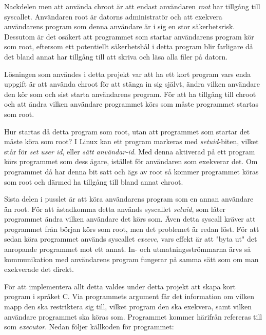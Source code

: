 \documentclass{article}
\begin{document}
Nackdelen men att använda chroot är att endast användaren \textit{root} har
tillgång till syscallet. Användaren root är datorns administratör och att
exekvera an\-vändarens program som denna användare är i sig en stor säkerhetsrisk.
Dessutom är det osäkert att programmet som startar användarens program kör som
root, eftersom ett potentiellt säkerhetshål i detta program blir farligare då
det bland annat har tillgång till att skriva och läsa alla filer på datorn.

Lösningen som användes i detta projekt var att ha ett kort program vars enda
uppgift är att använda chroot för att stänga in sig självt, ändra vilken
användare den kör som och sist starta användarens program. För att ha tillgång
till chroot och att ändra vilken användare programmet körs som måste programmet
startas som root.

Hur startas då detta program som root, utan att programmet som startar det måste
köra som root? I Linux kan ett program markeras med \textit{setuid}-biten,
vilket står för \textit{set user id}, eller \textit{sätt användar-id}. Med
denna aktiverad på ett program körs programmet som dess ägare, istället för
användaren som exekverar det. Om programmet då har denna bit satt och ägs av
root så kommer programmet köras som root och därmed ha tillgång till bland annat
chroot.

Sista delen i pusslet är att köra användarens program som en annan användare än
root. För att åstadkomma detta används syscallet \textit{setuid}, som låter
programmet ändra vilken användare det körs som. Även detta syscall kräver att
programmet från början körs som root, men det problemet är redan löst. För att
sedan köra programmet används syscallet \textit{execve}, vars effekt är att
"byta ut" det anropande programmet mot ett annat. In- och utmatningsströmmarna
ärvs så kommunikation med användarens program fungerar på samma sätt som om man
exekverade det direkt.

\hypertarget{executor}{}

För att implementera allt detta valdes under detta projekt att skapa kort
program i språket C. Via programmets argument får det information om vilken mapp
den ska restriktera sig till, vilket program den ska exekvera, samt vilken
användare programmet ska köras som. Programmet kommer härifrån refereras till
som \textit{executor}. Nedan följer källkoden för programmet:
\end{document}
